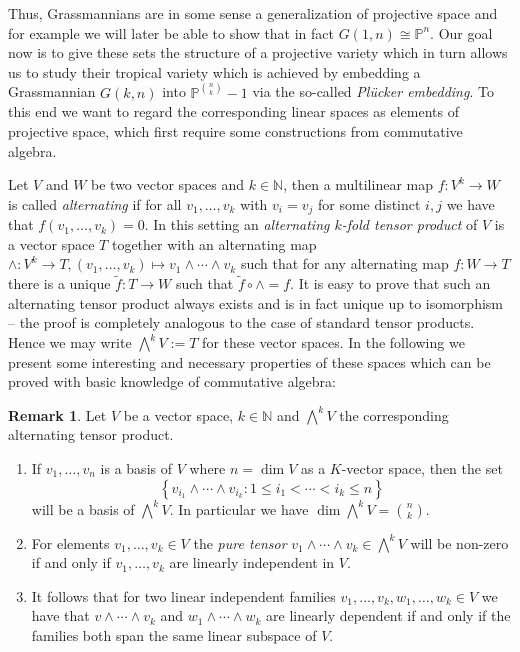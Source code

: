 \documentclass[
  paper=a4,
  DIV=14,
  fontsize=12pt,
  titlepage,
  bibliography=totoc,
  pagesize=pdftex
]{scrartcl}
\numberwithin{figure}{section}
\numberwithin{equation}{section}
\numberwithin{table}{section}
\newcommand*\setN{\mathds{N}}
\newcommand*\setP{\mathds{P}}
\theoremstyle{definition}
\newtheorem{remark}[definition]{Remark}
\numberwithin{definition}{section}
\begin{document}
Thus, Grassmannians are in some sense a generalization of projective space and for example
we will later be able to show that in fact $G(1,n) \cong \setP^n$. Our goal now is to
give these sets the structure of a projective variety which in turn allows us to study their
tropical variety which is achieved by embedding a Grassmannian $G(k, n)$ into $\setP^{\binom
nk}-1$ via the so-called \emph{Plücker embedding}. To this end we want to regard the
corresponding linear spaces as elements of projective space, which first require some
constructions from commutative algebra.

Let $V$ and $W$ be two vector spaces and $k\in\setN$, then a multilinear map $f : V^k \to
W$ is called \emph{alternating} if for all $v_1, \dots, v_k$ with $v_i=v_j$ for some
distinct $i,j$ we have that $f(v_1, \dots, v_k) = 0$. In this setting an \emph{alternating
$k$-fold tensor product} of $V$ is a vector space $T$ together with an alternating map
$\wedge:V^k\to T, (v_1, \dots, v_k) \mapsto v_1\wedge\cdots\wedge v_k$ such that for any
alternating map $f:W\to T$ there is a unique $\tilde f:T\to W$ such that $\tilde f \circ
\wedge = f$. It is easy to prove that such an alternating tensor product always exists and
is in fact unique up to isomorphism -- the proof is completely analogous to the case of
standard tensor products. Hence we may write $\bigwedge^k V := T$ for these vector spaces.
In the following we present some interesting and necessary properties of these spaces
which can be proved with basic knowledge of commutative algebra:

\begin{remark}
  Let $V$ be a vector space, $k \in \setN$ and $\bigwedge^k V$ the corresponding alternating
  tensor product.
  \begin{enumerate}
    \item If $v_1, \dots, v_n$ is a basis of $V$ where $n=\dim V$ as a $K$-vector space,
      then the set
      \[
        \left\{
          v_{i_1} \wedge \cdots \wedge v_{i_k} : 1\leq i_1 < \cdots < i_k \leq n
        \right\}
      \]
      will be a basis of $\bigwedge^kV$. In particular we have $\dim\bigwedge^kV = \binom
      nk$.
    \item For elements $v_1, \dots, v_k \in V$ the \emph{pure tensor} $v_1\wedge \cdots
      \wedge v_k \in \bigwedge^kV$ will be non-zero if and only if $v_1, \dots, v_k$ are
      linearly independent in $V$.
    \item It follows that for two linear independent families $v_1, \dots, v_k, w_1,
      \dots, w_k \in V$ we have that $v\wedge\cdots \wedge v_k$ and $w_1\wedge\cdots\wedge
      w_k$ are linearly dependent if and only if the families both span the same linear
      subspace of $V$.
  \end{enumerate}
\end{remark}
\end{document}

